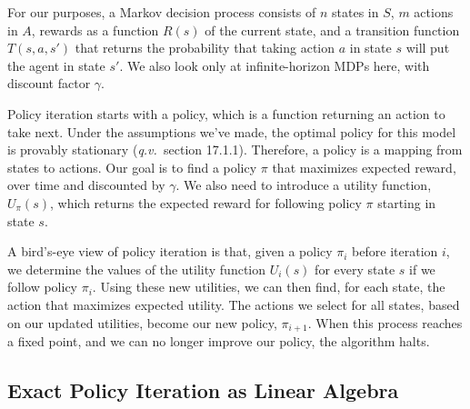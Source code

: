 \documentclass[paper=letter,pagesize=automedia,twoside=false,12pt]{scrartcl}
\theoremstyle{plain}%
\theoremstyle{definition}
\theoremstyle{remark}
\newcommand{\qv}{\textit{q.v.\ }}
\begin{document}
For our purposes, a Markov decision process consists of \(n\) states in \(S\), \(m\) actions in \(A\), rewards as a function \(R(s)\) of the current state, and a transition function \(T(s,a,s')\) that returns the probability that taking action \(a\) in state \(s\) will put the agent in state \(s'\).  We also look only at infinite-horizon MDPs here, with discount factor \(\gamma\).

Policy iteration starts with a policy, which is a function returning an action to take next.  Under the assumptions we've made, the optimal policy for this model is provably stationary (\qv section 17.1.1).  Therefore, a policy is a mapping from states to actions.  Our goal is to find a policy \(\pi\) that maximizes expected reward, over time and discounted by \(\gamma\).  We also need to introduce a utility function, \(U_\pi(s)\), which returns the expected reward for following policy \(\pi\) starting in state \(s\).

A bird's-eye view of policy iteration is that, given a policy \(\pi_i\) before iteration \(i\), we determine the values of the utility function \(U_{i}(s)\) for every state \(s\) if we follow policy \(\pi_i\).  Using these new utilities, we can then find, for each state, the action that maximizes expected utility.  The actions we select for all states, based on our updated utilities, become our new policy, \(\pi_{i+1}\).  When this process reaches a fixed point, and we can no longer improve our policy, the algorithm halts.

\subsection{Exact Policy Iteration as Linear Algebra}\label{sec:linear-alg}
\end{document}
